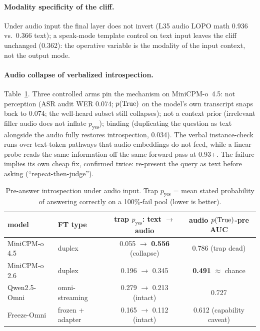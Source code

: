 \paragraph{Modality specificity of the cliff.} Under audio input the
final layer does not invert (L35 audio LOPO math 0.936 vs.\ 0.366
text); a speak-mode template control on text input leaves the cliff
unchanged (0.362): the operative variable is the modality of the
input context, not the output mode.

\paragraph{Audio collapse of verbalized introspection.}
Table~\ref{tab:audioptrue}. Three controlled arms pin the mechanism on
MiniCPM-o~4.5: not perception (ASR audit WER 0.074; $p(\mathrm{True})$ on
the model's own transcript snaps back to 0.074; the well-heard subset
still collapses); not a context prior (irrelevant filler audio
does not inflate $p_{\mathrm{yes}}$); binding (duplicating the
question as text alongside the audio fully restores introspection,
0.034). The verbal instance-check runs over text-token pathways that
audio embeddings do not feed, while a linear probe reads the same
information off the same forward pass at 0.93+. The failure implies its
own cheap fix, confirmed twice: re-present the query as text before
asking (``repeat-then-judge'').

\begin{table}[h]
\centering\small
\caption{Pre-answer introspection under audio input. Trap
$p_{\mathrm{yes}}$ = mean stated probability of answering correctly on
a 100\%-fail pool (lower is better).}
\label{tab:audioptrue}
\begin{tabular}{llcc}
\toprule
model & FT type & trap $p_{\mathrm{yes}}$: text $\rightarrow$ audio & audio $p(\mathrm{True})$-pre AUC \\
\midrule
MiniCPM-o 4.5 & duplex & 0.055 $\rightarrow$ \textbf{0.556} (collapse) & 0.786 (trap dead) \\
MiniCPM-o 2.6 & duplex & 0.196 $\rightarrow$ 0.345 & \textbf{0.491} $\approx$ chance \\
Qwen2.5-Omni & omni-streaming & 0.279 $\rightarrow$ 0.213 (intact) & 0.727 \\
Freeze-Omni & frozen + adapter & 0.165 $\rightarrow$ 0.112 (intact) & 0.612 (capability caveat) \\
\bottomrule
\end{tabular}
\end{table}

